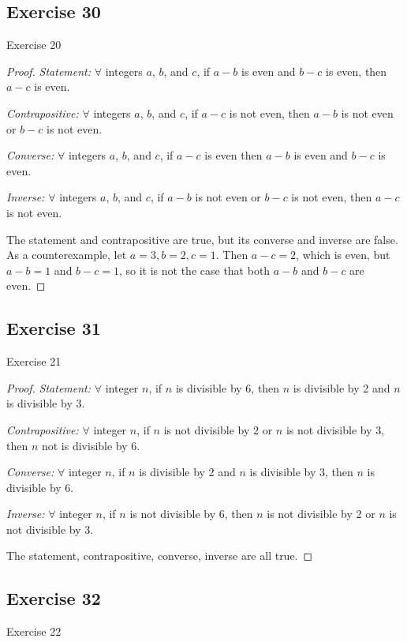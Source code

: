 \documentclass[14pt]{extarticle}
\newcommand{\fa}{\forall}
\begin{document}
\subsection{Exercise 30}
Exercise 20

\begin{proof}
{\it Statement:} $\fa$ integers $a$, $b$, and $c$, if $a - b$ is even and $b - c$ is even, then $a - c$ is even.

{\it Contrapositive:} $\fa$ integers $a$, $b$, and $c$, if $a - c$ is not even, then $a - b$ is not even or $b - c$ is not even.

{\it Converse:} $\fa$ integers $a$, $b$, and $c$, if $a - c$ is even then $a - b$ is even and $b - c$ is even.

{\it Inverse:} $\fa$ integers $a$, $b$, and $c$, if $a - b$ is not even or $b - c$ is not even, then $a - c$ is not even.

The statement and contrapositive are true, but its converse and inverse are false. As a counterexample, let $a = 3, b = 2, c = 1$. Then $a - c = 2$, which is even, but $a - b = 1$ and $b - c = 1$, so it is not the case that both $a - b$ and $b - c$ are even.
\end{proof}

\subsection{Exercise 31}
Exercise 21

\begin{proof}
{\it Statement:} $\fa$ integer $n$, if $n$ is divisible by 6, then $n$ is divisible by 2 and $n$ is divisible by 3.

{\it Contrapositive:} $\fa$ integer $n$, if $n$ is not divisible by 2 or $n$ is not divisible by 3, then $n$ not is divisible by 6.

{\it Converse:} $\fa$ integer $n$, if $n$ is divisible by 2 and $n$ is divisible by 3, then $n$ is divisible by 6.

{\it Inverse:} $\fa$ integer $n$, if $n$ is not divisible by 6, then $n$ is not divisible by 2 or $n$ is not divisible by 3.

The statement, contrapositive, converse, inverse are all true.
\end{proof}

\subsection{Exercise 32}
Exercise 22
\end{document}
